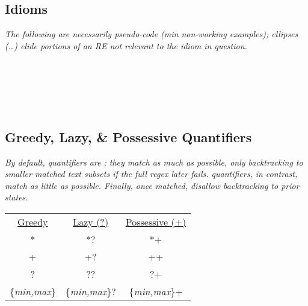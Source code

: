 \subsection*{Idioms}

\textit{The following are necessarily pseudo-code (min non-working examples); ellipses (\dots) elide portions of an RE not relevant to the idiom in question.}\\
\\
\\
\\
\\
\\



\subsection*{Greedy, Lazy, \& Possessive Quantifiers}
\textit{By default, quantifiers are ; they match as much as possible, only backtracking to smaller matched text subsets if the full regex later fails.  quantifiers, in contrast, match as little as possible. Finally,  once matched, disallow backtracking to prior states.}\\
\begin{tabular}{c | c | c}
    \ul{Greedy}  & \ul{Lazy (?)}       & \ul{Possessive (+)}       \\
    *       & *?              & *+ \\
    +       & +?              & ++ \\
    ?       & ??              & ?+ \\
    {\footnotesize \{\textit{min,max}\}} & {\footnotesize \{\textit{min,max}\}?}            & 
    {\footnotesize \{\textit{min,max}\}+}            \\
\end{tabular}

\vspace{2mm}
\\
\\




